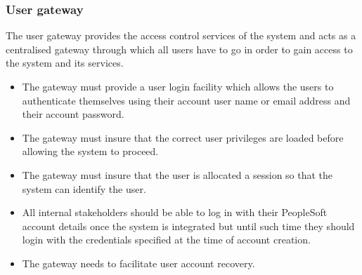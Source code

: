 \documentclass[12pt]{article}
\begin{document}
\subsubsection{User gateway}
	The user gateway provides the access control services of the system and acts as a centralised gateway through which all users have to go in order to gain access to the system and its services. 
	\begin{itemize}
		\item The gateway must provide a user login facility which allows the users to authenticate themselves using their account user name or email address and their account password.
		\item The gateway must insure that the correct user privileges are loaded before allowing the system to proceed.
		\item The gateway must insure that the user is allocated a session so that the system can identify the user.
		\item All internal stakeholders should be able to log in with their PeopleSoft account details once the system is integrated but until such time they should login with the credentials specified at the time of account creation. 
		\item The gateway needs to facilitate user account recovery.
		 
	\end{itemize}
\end{document}
